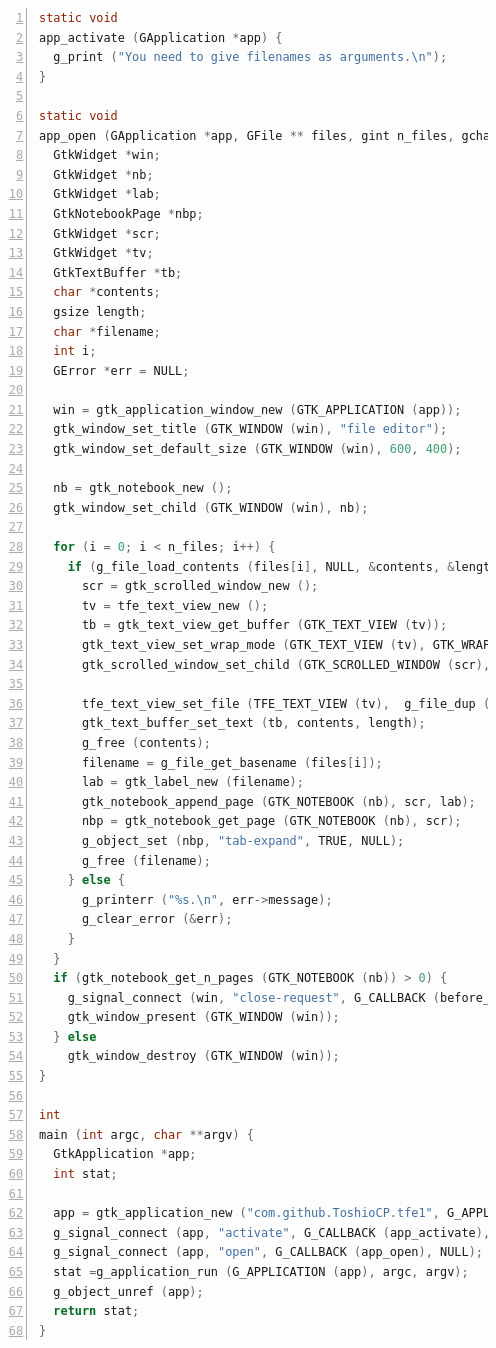 \begin{lstlisting}[language=C, numbers=left]
static void
app_activate (GApplication *app) {
  g_print ("You need to give filenames as arguments.\n");
}

static void
app_open (GApplication *app, GFile ** files, gint n_files, gchar *hint) {
  GtkWidget *win;
  GtkWidget *nb;
  GtkWidget *lab;
  GtkNotebookPage *nbp;
  GtkWidget *scr;
  GtkWidget *tv;
  GtkTextBuffer *tb;
  char *contents;
  gsize length;
  char *filename;
  int i;
  GError *err = NULL;

  win = gtk_application_window_new (GTK_APPLICATION (app));
  gtk_window_set_title (GTK_WINDOW (win), "file editor");
  gtk_window_set_default_size (GTK_WINDOW (win), 600, 400);

  nb = gtk_notebook_new ();
  gtk_window_set_child (GTK_WINDOW (win), nb);

  for (i = 0; i < n_files; i++) {
    if (g_file_load_contents (files[i], NULL, &contents, &length, NULL, &err)) {
      scr = gtk_scrolled_window_new ();
      tv = tfe_text_view_new ();
      tb = gtk_text_view_get_buffer (GTK_TEXT_VIEW (tv));
      gtk_text_view_set_wrap_mode (GTK_TEXT_VIEW (tv), GTK_WRAP_WORD_CHAR);
      gtk_scrolled_window_set_child (GTK_SCROLLED_WINDOW (scr), tv);

      tfe_text_view_set_file (TFE_TEXT_VIEW (tv),  g_file_dup (files[i]));
      gtk_text_buffer_set_text (tb, contents, length);
      g_free (contents);
      filename = g_file_get_basename (files[i]);
      lab = gtk_label_new (filename);
      gtk_notebook_append_page (GTK_NOTEBOOK (nb), scr, lab);
      nbp = gtk_notebook_get_page (GTK_NOTEBOOK (nb), scr);
      g_object_set (nbp, "tab-expand", TRUE, NULL);
      g_free (filename);
    } else {
      g_printerr ("%s.\n", err->message);
      g_clear_error (&err);
    }
  }
  if (gtk_notebook_get_n_pages (GTK_NOTEBOOK (nb)) > 0) {
    g_signal_connect (win, "close-request", G_CALLBACK (before_close), nb);
    gtk_window_present (GTK_WINDOW (win));
  } else
    gtk_window_destroy (GTK_WINDOW (win));
}

int
main (int argc, char **argv) {
  GtkApplication *app;
  int stat;

  app = gtk_application_new ("com.github.ToshioCP.tfe1", G_APPLICATION_HANDLES_OPEN);
  g_signal_connect (app, "activate", G_CALLBACK (app_activate), NULL);
  g_signal_connect (app, "open", G_CALLBACK (app_open), NULL);
  stat =g_application_run (G_APPLICATION (app), argc, argv);
  g_object_unref (app);
  return stat;
}
\end{lstlisting}

